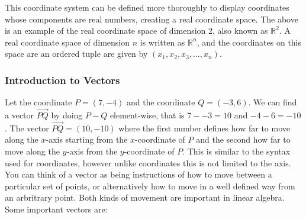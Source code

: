 \documentclass[a4paper,oneside]{report}
\begin{document}
This coordinate system can be defined more thoroughly to display coordinates
whose components are real numbers, creating a real coordinate space. The above
is an example of the real coordinate space of dimension 2, also known as
\( \mathbb{R}^2 \). A real coordinate space of dimension \( n \) is written as
\( \mathbb{R}^n \), and the coordinates on this space are an ordered tuple
are given by \( (x_1, x_2, x_3, \dots, x_n) \).

\subsubsection{Introduction to Vectors}

Let the coordinate \( P = (7, -4) \) and the coordinate \( Q = (-3, 6) \). We
can find a vector \( \overrightarrow{PQ} \) by doing \( P - Q \) element-wise,
that is \( 7 - -3 = 10 \) and \( -4 - 6 = -10 \). The vector
\( \overrightarrow{PQ} = (10, -10) \) where the first number defines how far
to move along the \( x \)-axis starting from the \( x \)-coordinate of \( P \)
and the second how far to move along the \( y \)-axis from the
\( y \)-coordinate of \( P \). This is similar to the syntax used for
coordinates, however unlike coordinates this is not limited to the axis. You
can think of a vector as being instructions of how to move between a
particular set of points, or alternatively how to move in a well defined way
from an arbritrary point. Both kinds of movement are important in linear
algebra. Some important vectors are:
\end{document}
